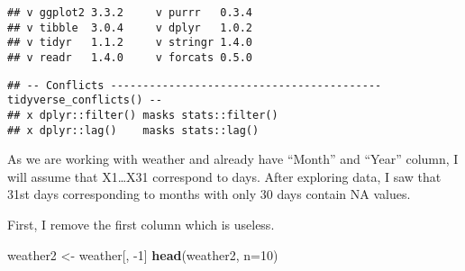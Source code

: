 \documentclass[
]{article}
\newenvironment{Shaded}{\begin{snugshade}}{\end{snugshade}}
\newcommand{\DataTypeTok}[1]{\textcolor[rgb]{0.13,0.29,0.53}{#1}}
\newcommand{\DecValTok}[1]{\textcolor[rgb]{0.00,0.00,0.81}{#1}}
\newcommand{\KeywordTok}[1]{\textcolor[rgb]{0.13,0.29,0.53}{\textbf{#1}}}
\newcommand{\NormalTok}[1]{#1}
\newcommand{\StringTok}[1]{\textcolor[rgb]{0.31,0.60,0.02}{#1}}
\begin{document}
\begin{verbatim}
## v ggplot2 3.3.2     v purrr   0.3.4
## v tibble  3.0.4     v dplyr   1.0.2
## v tidyr   1.1.2     v stringr 1.4.0
## v readr   1.4.0     v forcats 0.5.0
\end{verbatim}

\begin{verbatim}
## -- Conflicts ------------------------------------------ tidyverse_conflicts() --
## x dplyr::filter() masks stats::filter()
## x dplyr::lag()    masks stats::lag()
\end{verbatim}

As we are working with weather and already have ``Month'' and ``Year''
column, I will assume that X1\ldots X31 correspond to days. After
exploring data, I saw that 31st days corresponding to months with only
30 days contain NA values.

First, I remove the first column which is useless.

\begin{Shaded}
\begin{Highlighting}[]
\NormalTok{weather2 <-}\StringTok{ }\NormalTok{weather[, }\DecValTok{-1}\NormalTok{]}
\KeywordTok{head}\NormalTok{(weather2, }\DataTypeTok{n=}\DecValTok{10}\NormalTok{)}
\end{Highlighting}
\end{Shaded}
\end{document}
